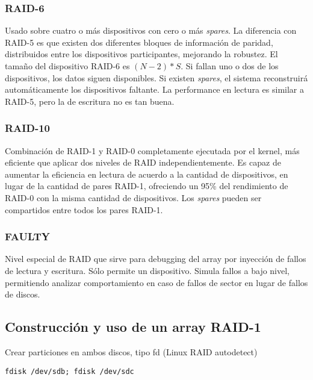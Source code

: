 \subsubsection{RAID-6}
\label{ssub:RAID-6}
Usado sobre cuatro o más dispositivos con cero o más \emph{spares}. La diferencia con RAID-5 es que existen dos diferentes bloques de información de paridad, distribuidos entre los dispositivos participantes, mejorando la robustez. El tamaño del dispositivo RAID-6 es $(N-2)*S$. Si fallan uno o dos de los dispositivos, los datos siguen disponibles. Si existen \emph{spares}, el sistema reconstruirá automáticamente los dispositivos faltante. La performance en lectura es similar a RAID-5, pero la de escritura no es tan buena.

\subsubsection{RAID-10}
\label{ssub:RAID-10}
Combinación de RAID-1 y RAID-0 completamente ejecutada por el kernel, más eficiente que aplicar dos niveles de RAID independientemente. Es capaz de aumentar la eficiencia en lectura de acuerdo a la cantidad de dispositivos, en lugar de la cantidad de pares RAID-1, ofreciendo un 95\% del rendimiento de RAID-0 con la misma cantidad de dispositivos. Los \emph{spares} pueden ser compartidos entre todos los pares RAID-1.


\subsubsection{FAULTY}
\label{ssub:FAULTY}

Nivel especial de RAID que sirve para debugging del array por inyección de fallos de lectura y escritura. Sólo permite un dispositivo. Simula fallos a bajo nivel, permitiendo analizar comportamiento en caso de fallos de sector en lugar de fallos de discos.




\subsection{Construcción y uso de un array RAID-1}



Crear particiones en ambos discos, tipo fd (Linux RAID autodetect)
\begin{lstlisting}
fdisk /dev/sdb; fdisk /dev/sdc
\end{lstlisting}

